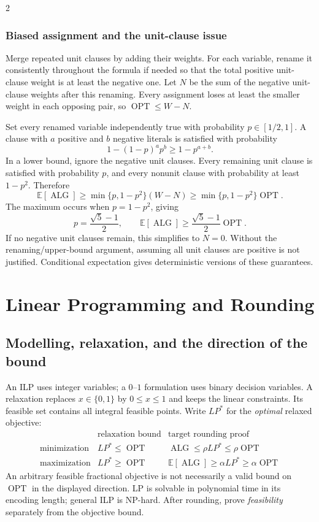 \documentclass[10pt]{article}
\theoremstyle{definition}
\newcommand{\OPT}{\operatorname{OPT}}
\newcommand{\ALG}{\operatorname{ALG}}
\begin{document}
\begin{multicols*}{2}
\subsubsection*{Biased assignment and the unit-clause issue}
Merge repeated unit clauses by adding their weights. For each variable,
rename it consistently throughout the formula if needed so that the total
positive unit-clause weight is at least the negative one. Let $N$ be the sum
of the negative unit-clause weights after this renaming. Every assignment
loses at least the smaller weight in each opposing pair, so
$\OPT\le W-N$.

Set every renamed variable independently true with probability
$p\in[1/2,1]$. A clause with $a$ positive and $b$ negative literals is
satisfied with probability
\[
  1-(1-p)^a p^b\ge1-p^{a+b}.
\]
In a lower bound, ignore the negative unit clauses. Every remaining unit
clause is satisfied with probability $p$, and every nonunit clause with
probability at least $1-p^2$. Therefore
\[
  \mathbb E[\ALG]\ge\min\{p,1-p^2\}(W-N)
    \ge\min\{p,1-p^2\}\OPT.
\]
The maximum occurs when $p=1-p^2$, giving
\[
  p=\frac{\sqrt5-1}{2},\qquad
  \mathbb E[\ALG]\ge\frac{\sqrt5-1}{2}\OPT.
\]
If no negative unit clauses remain, this simplifies to $N=0$.
Without the renaming/upper-bound argument, assuming all unit clauses are
positive is not justified. Conditional expectation gives deterministic
versions of these guarantees.

\section{Linear Programming and Rounding}\label{lp:main}

\subsection{Modelling, relaxation, and the direction of the bound}\label{lp:template}
An ILP uses integer variables; a $0$--$1$ formulation uses binary decision
variables. A relaxation replaces $x\in\{0,1\}$ by $0\le x\le1$ and keeps
the linear constraints. Its feasible set contains all integral feasible
points. Write $LP^*$ for the \emph{optimal} relaxed objective:
\[
  \begin{array}{c|c|c}
    &\text{relaxation bound}&\text{target rounding proof}\\\hline
    \text{minimization}&LP^*\le\OPT&\ALG\le\rho LP^*\le\rho\OPT\\
    \text{maximization}&LP^*\ge\OPT&
       \mathbb E[\ALG]\ge\alpha LP^*\ge\alpha\OPT
  \end{array}
\]
An arbitrary feasible fractional objective is not necessarily a valid bound
on $\OPT$ in the displayed direction. LP is solvable in polynomial time in
its encoding length; general ILP is NP-hard. After rounding, prove
\emph{feasibility} separately from the objective bound.


\end{multicols*}
\end{document}
